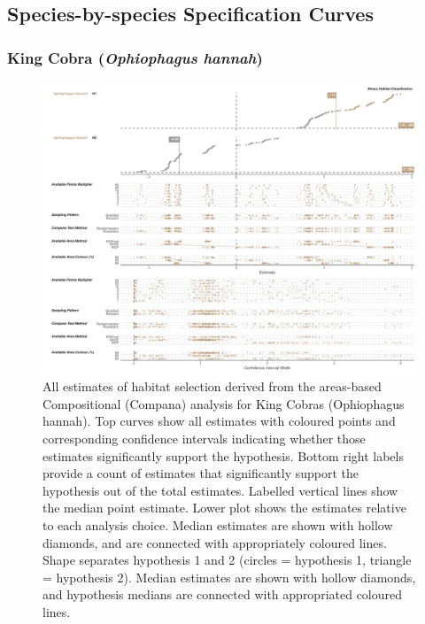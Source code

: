 \documentclass[10pt,a4paper]{article}
\begin{document}
\subsection{Species-by-species Specification Curves}\label{species-by-species-specification-curves}

\subsubsection{\texorpdfstring{King Cobra (\emph{Ophiophagus hannah})}{King Cobra (Ophiophagus hannah)}}\label{king-cobra-ophiophagus-hannah}

\begin{figure}
\includegraphics[width=1\linewidth]{../../figures/specCurve_Ophiophagus hannah_area} \caption{All estimates of habitat selection derived from the areas-based Compositional (Compana) analysis for King Cobras (Ophiophagus hannah). Top curves show all estimates with coloured points and corresponding confidence intervals indicating whether those estimates significantly support the hypothesis. Bottom right labels provide a count of estimates that significantly support the hypothesis out of the total estimates. Labelled vertical lines show the median point estimate. Lower plot shows the estimates relative to each analysis choice. Median estimates are shown with hollow diamonds, and are connected with appropriately coloured lines. Shape separates hypothesis 1 and 2 (circles = hypothesis 1, triangle = hypothesis 2). Median estimates are shown with hollow diamonds, and hypothesis medians are connected with appropriated coloured lines. }\label{fig:specCurveAreaOPHA}
\end{figure}
\end{document}

